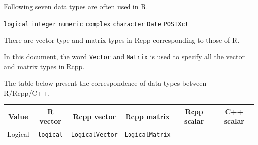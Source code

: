 \documentclass[]{book}
\theoremstyle{definition}
\theoremstyle{definition}
\theoremstyle{remark}
\begin{document}
Following seven data types are often used in R.

\texttt{logical} \texttt{integer} \texttt{numeric} \texttt{complex}
\texttt{character} \texttt{Date} \texttt{POSIXct}

There are vector type and matrix types in Rcpp corresponding to those of
R.

In this document, the word \texttt{Vector} and \texttt{Matrix} is used
to specify all the vector and matrix types in Rcpp.

The table below present the correspondence of data types between
R/Rcpp/C++.

\begin{longtable}[]{@{}cccccc@{}}
\toprule
\begin{minipage}[b]{0.07\columnwidth}\centering\strut
Value\strut
\end{minipage} & \begin{minipage}[b]{0.07\columnwidth}\centering\strut
R vector\strut
\end{minipage} & \begin{minipage}[b]{0.07\columnwidth}\centering\strut
Rcpp vector\strut
\end{minipage} & \begin{minipage}[b]{0.07\columnwidth}\centering\strut
Rcpp matrix\strut
\end{minipage} & \begin{minipage}[b]{0.07\columnwidth}\centering\strut
Rcpp scalar\strut
\end{minipage} & \begin{minipage}[b]{0.07\columnwidth}\centering\strut
C++ scalar\strut
\end{minipage}\tabularnewline
\midrule
\endhead
\begin{minipage}[t]{0.07\columnwidth}\centering\strut
Logical\strut
\end{minipage} & \begin{minipage}[t]{0.07\columnwidth}\centering\strut
\texttt{logical}\strut
\end{minipage} & \begin{minipage}[t]{0.07\columnwidth}\centering\strut
\texttt{LogicalVector}\strut
\end{minipage} & \begin{minipage}[t]{0.07\columnwidth}\centering\strut
\texttt{LogicalMatrix}\strut
\end{minipage} & \begin{minipage}[t]{0.07\columnwidth}\centering\strut
-\strut
\end{minipage} & \begin{minipage}[t]{0.07\columnwidth}\centering\strut

\end{minipage}
\end{longtable}
\end{document}
